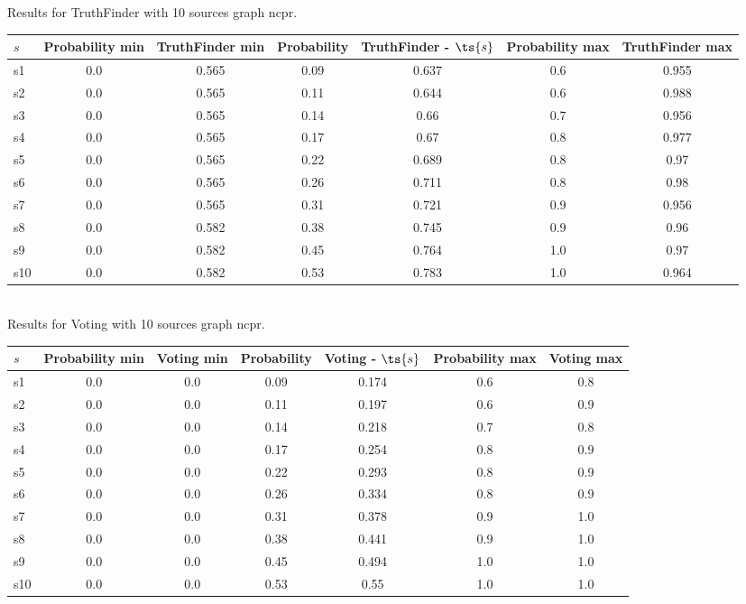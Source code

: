 \documentclass{article}
\begin{document}
\noindent Results for TruthFinder with 10 sources graph ncpr.

\noindent\begin{tabular}{|l|c|c|c|c|c|c|}
\hline
$s$& Probability min & TruthFinder min & Probability & TruthFinder - $\ts{s}$ & Probability max & TruthFinder max\\
\hline
s1 &0.0 & 0.565 & 0.09 & 0.637 & 0.6 & 0.955\\
\hline
s2 &0.0 & 0.565 & 0.11 & 0.644 & 0.6 & 0.988\\
\hline
s3 &0.0 & 0.565 & 0.14 & 0.66 & 0.7 & 0.956\\
\hline
s4 &0.0 & 0.565 & 0.17 & 0.67 & 0.8 & 0.977\\
\hline
s5 &0.0 & 0.565 & 0.22 & 0.689 & 0.8 & 0.97\\
\hline
s6 &0.0 & 0.565 & 0.26 & 0.711 & 0.8 & 0.98\\
\hline
s7 &0.0 & 0.565 & 0.31 & 0.721 & 0.9 & 0.956\\
\hline
s8 &0.0 & 0.582 & 0.38 & 0.745 & 0.9 & 0.96\\
\hline
s9 &0.0 & 0.582 & 0.45 & 0.764 & 1.0 & 0.97\\
\hline
s10 &0.0 & 0.582 & 0.53 & 0.783 & 1.0 & 0.964\\
\hline
\end{tabular}\\

\noindent Results for Voting with 10 sources graph ncpr.

\noindent\begin{tabular}{|l|c|c|c|c|c|c|}
\hline
$s$& Probability min & Voting min & Probability & Voting - $\ts{s}$ & Probability max & Voting max\\
\hline
s1 &0.0 & 0.0 & 0.09 & 0.174 & 0.6 & 0.8\\
\hline
s2 &0.0 & 0.0 & 0.11 & 0.197 & 0.6 & 0.9\\
\hline
s3 &0.0 & 0.0 & 0.14 & 0.218 & 0.7 & 0.8\\
\hline
s4 &0.0 & 0.0 & 0.17 & 0.254 & 0.8 & 0.9\\
\hline
s5 &0.0 & 0.0 & 0.22 & 0.293 & 0.8 & 0.9\\
\hline
s6 &0.0 & 0.0 & 0.26 & 0.334 & 0.8 & 0.9\\
\hline
s7 &0.0 & 0.0 & 0.31 & 0.378 & 0.9 & 1.0\\
\hline
s8 &0.0 & 0.0 & 0.38 & 0.441 & 0.9 & 1.0\\
\hline
s9 &0.0 & 0.0 & 0.45 & 0.494 & 1.0 & 1.0\\
\hline
s10 &0.0 & 0.0 & 0.53 & 0.55 & 1.0 & 1.0\\
\hline
\end{tabular}\\
\end{document}
